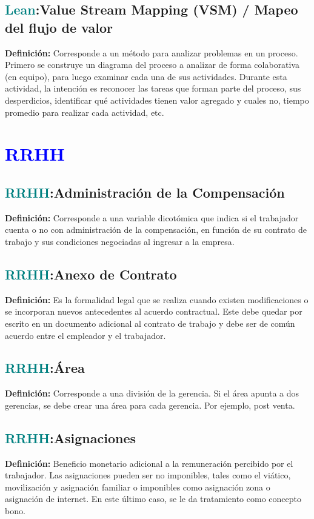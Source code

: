 \documentclass[12pt]{article}
\begin{document}
\subsection{\textcolor{teal}{Lean}:{Value Stream Mapping (VSM) / Mapeo del flujo de valor}}
\textbf{Definición:} Corresponde a un método para analizar problemas en un proceso. Primero se construye un diagrama del proceso a analizar de forma colaborativa (en equipo), para luego examinar cada una de sus actividades. Durante esta actividad, la intención es reconocer las tareas que forman parte del proceso, sus desperdicios, identificar qué actividades tienen valor agregado y cuales no, tiempo promedio para realizar cada actividad, etc.
\section{\textcolor{blue}{RRHH}}
\subsection{\textcolor{teal}{RRHH}:{Administración de la Compensación}}
\textbf{Definición:} Corresponde a una variable dicotómica que indica si el trabajador cuenta o no con administración de la compensación, en función de su contrato de trabajo y sus condiciones negociadas al ingresar a la empresa.
\subsection{\textcolor{teal}{RRHH}:{Anexo de Contrato}}
\textbf{Definición:} Es la formalidad legal que se realiza cuando existen modificaciones o se incorporan nuevos antecedentes al acuerdo contractual. Este debe quedar por escrito en un documento adicional al contrato de trabajo y debe ser de común acuerdo entre el empleador y el trabajador.
\subsection{\textcolor{teal}{RRHH}:{Área}}
\textbf{Definición:} Corresponde a una división de la gerencia. Si el área apunta a dos gerencias, se debe crear una área para cada gerencia. Por ejemplo, post venta.
\subsection{\textcolor{teal}{RRHH}:{Asignaciones}}
\textbf{Definición:} Beneficio monetario adicional a la remuneración percibido por el trabajador. Las asignaciones pueden ser no imponibles, tales como el viático, movilización y asignación familiar o imponibles como asignación zona o asignación de internet. En este último caso, se le da tratamiento como concepto bono.
\end{document}
